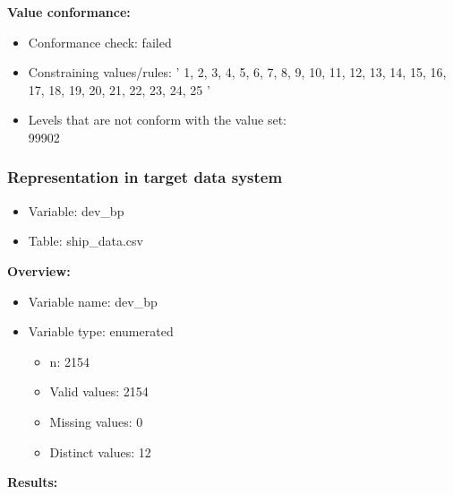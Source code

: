 \documentclass[
]{article}
\providecommand{\tightlist}{%
  \setlength{\itemsep}{0pt}\setlength{\parskip}{0pt}}
\begin{document}
\textbf{Value conformance:}

\begin{itemize}
\tightlist
\item
  Conformance check: failed
\item
  Constraining values/rules: ' 1, 2, 3, 4, 5, 6, 7, 8, 9, 10, 11, 12,
  13, 14, 15, 16, 17, 18, 19, 20, 21, 22, 23, 24, 25 '
\item
  Levels that are not conform with the value set:\\
  99902
\end{itemize}

\newpage

\hypertarget{representation-in-target-data-system-5}{%
\subsubsection{\texorpdfstring{Representation in \textbf{target} data
system}{Representation in target data system}}\label{representation-in-target-data-system-5}}

\begin{itemize}
\tightlist
\item
  Variable: dev\_bp
\item
  Table: ship\_data.csv
\end{itemize}

\textbf{Overview:}

\begin{itemize}
\tightlist
\item
  Variable name: dev\_bp
\item
  Variable type: enumerated

  \begin{itemize}
  \tightlist
  \item
    n: 2154
  \item
    Valid values: 2154
  \item
    Missing values: 0
  \item
    Distinct values: 12
  \end{itemize}
\end{itemize}

\textbf{Results:}\\
\end{document}
